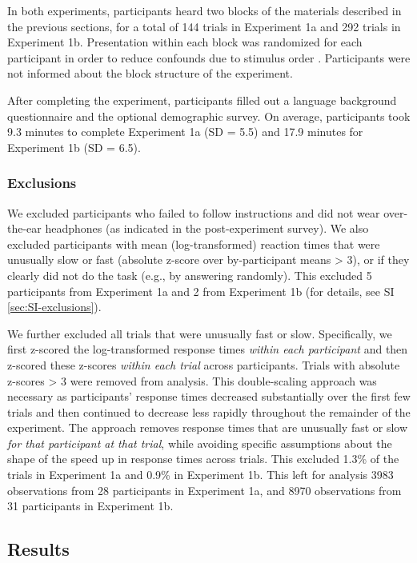 \documentclass[preprint]{JASA}
\begin{document}
In both experiments, participants heard two blocks of the materials described in the previous sections, for a total of 144 trials in Experiment 1a and 292 trials in Experiment 1b. Presentation within each block was randomized for each participant in order to reduce confounds due to stimulus order \citep[known to affect vowel perception,][ and references therein]{repp-crowder1990}. Participants were not informed about the block structure of the experiment.

After completing the experiment, participants filled out a language background questionnaire and the optional demographic survey. On average, participants took 9.3 minutes to complete Experiment 1a (SD = 5.5) and 17.9 minutes for Experiment 1b (SD = 6.5).

\subsubsection{Exclusions}\label{exclusions}

We excluded participants who failed to follow instructions and did not wear over-the-ear headphones (as indicated in the post-experiment survey). We also excluded participants with mean (log-transformed) reaction times that were unusually slow or fast (absolute z-score over by-participant means \textgreater{} 3), or if they clearly did not do the task (e.g., by answering randomly). This excluded 5 participants from Experiment 1a and 2 from Experiment 1b (for details, see SI \ref{sec:SI-exclusions}).

We further excluded all trials that were unusually fast or slow. Specifically, we first z-scored the log-transformed response times \emph{within each participant} and then z-scored these z-scores \emph{within each trial} across participants. Trials with absolute z-scores \textgreater{} 3 were removed from analysis. This double-scaling approach was necessary as participants' response times decreased substantially over the first few trials and then continued to decrease less rapidly throughout the remainder of the experiment. The approach removes response times that are unusually fast or slow \emph{for that participant at that trial}, while avoiding specific assumptions about the shape of the speed up in response times across trials. This excluded 1.3\% of the trials in Experiment 1a and 0.9\% in Experiment 1b. This left for analysis 3983 observations from 28 participants in Experiment 1a, and 8970 observations from 31 participants in Experiment 1b.

\subsection{Results}\label{sec:experiment-results}
\end{document}
